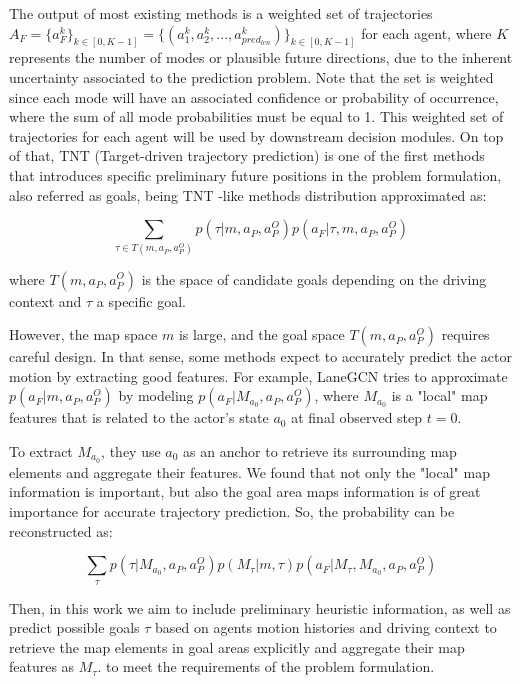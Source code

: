 The output of most existing methods is a weighted set of trajectories $A_F = \{a_{F}^k\}_{k \in [0,K-1]}= \{(a_{1}^k,a_{2}^k,...,a_{pred_{len}}^k)\}_{k \in [0,K-1]}$ for each agent, where $K$ represents the number of modes or plausible future directions, due to the inherent uncertainty associated to the prediction problem. Note that the set is weighted since each mode will have an associated confidence or probability of occurrence, where the sum of all mode probabilities must be equal to 1. This weighted set of trajectories for each agent will be used by downstream decision modules. On top of that, TNT (Target-driven trajectory prediction) \cite{zhao2021tnt} is one of the first methods that introduces specific preliminary future positions in the problem formulation, also referred as goals, being TNT \cite{zhao2021tnt}-like methods distribution approximated as:

\begin{equation}
	\sum_{\tau \in T(m, a_P, a^O_P)}{p(\tau|m, a_P, a^O_P)p(a_F|\tau, m, a_P, a^O_P)}
\end{equation}

where $T(m, a_P, a^O_P)$ is the space of candidate goals depending on the driving context and $\tau$ a specific goal.

However, the map space $m$ is large, and the goal space $T(m, a_P, a^O_P)$ requires careful design. In that sense, some methods expect to accurately predict the actor motion by extracting good features. For example, LaneGCN \cite{liang2020learning} tries to approximate $p(a_F|m, a_P, a^O_P)$ by modeling $p(a_F|M_{a_0}, a_P, a^O_P)$, where $M_{a_0}$ is a "local" map features that is related to the actor's state $a_0$ at final observed step $t=0$.

To extract $M_{a_0}$, they use $a_0$ as an anchor to retrieve its surrounding map elements and aggregate their features. We found that not only the "local" map information is important, but also the goal area maps information is of great importance for accurate trajectory prediction. So, the probability can be reconstructed as:

\begin{equation}
	\sum _{\tau}{p(\tau|M_{a_0}, a_P, a^O_P) p(M_{\tau}|m, \tau)p(a_F|M_{\tau},M_{a_0}, a_P, a^O_P)}
\end{equation}

Then, in this work we aim to include preliminary heuristic information, as well as predict possible goals $\tau$ based on agents motion histories and driving context to retrieve the map elements in goal areas explicitly and aggregate their map features as $M_{\tau}$. to meet the requirements of the problem formulation. 


